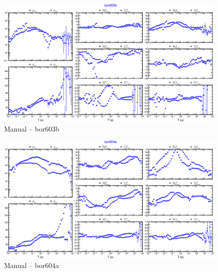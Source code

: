     \begin{figure}[H]
        \caption{Manual -- bor603b}
            \begin{center}
                \includegraphics[width=15cm]{texto/figura/sites/M-bor603b.png}
            \end{center}
    \end{figure}
    \begin{figure}[H]
        \caption{Manual -- bor604a}
            \begin{center}
                \includegraphics[width=15cm]{texto/figura/sites/M-bor604a.png}
            \end{center}
    \end{figure}
    
